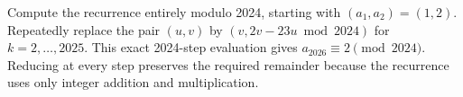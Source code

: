 Compute the recurrence entirely modulo 2024, starting with $(a_1,a_2)=(1,2)$. Repeatedly replace the pair $(u,v)$ by $(v,2v-23u\bmod2024)$ for $k=2,\ldots,2025$. This exact 2024-step evaluation gives $a_{2026}\equiv\boxed2\pmod{2024}$. Reducing at every step preserves the required remainder because the recurrence uses only integer addition and multiplication.
